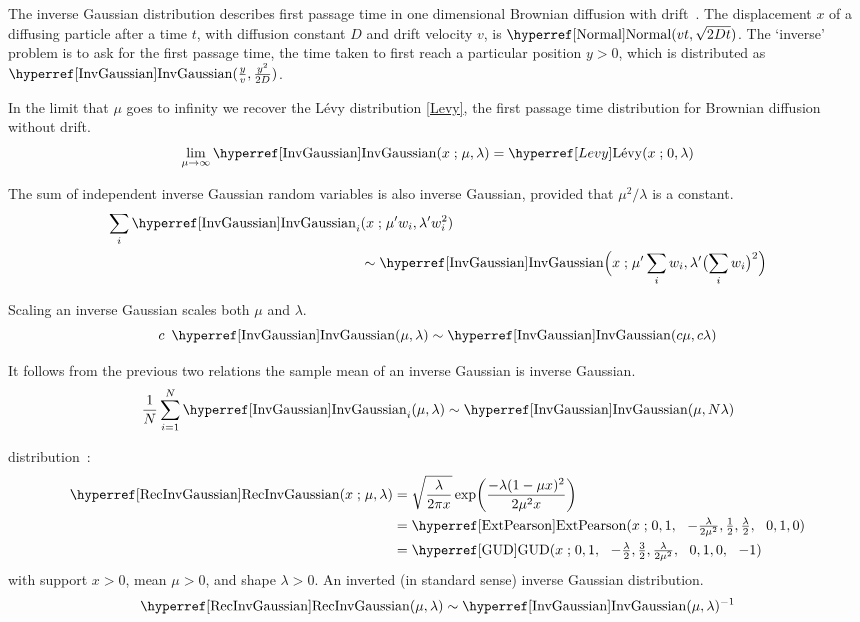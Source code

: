 The inverse Gaussian distribution describes first passage time in one dimensional Brownian diffusion with drift~\cite{Chhikara1989}. The displacement $x$ of a diffusing particle after a time $t$, with diffusion constant $D$ and drift velocity $v$,  is $\opr{Normal}(vt, \sqrt{2 D t})$. The `inverse' problem is to ask for the first passage time, the time taken to first reach a particular position $y>0$, which is distributed as $\opr{InvGaussian}(\tfrac{y}{v},\tfrac{y^2}{2D})$. 

In the limit that $\mu$ goes to infinity we recover the L\'evy distribution \eqref{Levy}, the first passage time distribution for Brownian diffusion without drift.
\[
\lim_{\mu\rightarrow\infty} \opr{InvGaussian}(x\given \mu, \lambda) = \Levy(x\given 0,\lambda) \checked
\notag
\]

The sum of independent inverse Gaussian random variables is also inverse Gaussian, provided that $\mu^2/\lambda$ is a constant.
\begin{align*}
\sum_i \opr{InvGaussian}_i &(x\given \mu' w_i, \lambda' w_i^2) 
\\
& \sim \opr{InvGaussian}\Bigl(x\given \mu' \sum_i w_i, \lambda' \bigl(\sum_i w_i\bigr)^2 \Bigr) \checked
\end{align*}

Scaling an inverse Gaussian scales both $\mu$ and $\lambda$. 
\[
c\ \opr{InvGaussian} (\mu, \lambda) \sim \opr{InvGaussian} (c \mu, c \lambda) \checked
\notag
\]

It follows from the previous two relations the sample mean of an inverse Gaussian is inverse Gaussian.
\[
\frac{1}{N} \sum_{i=1}^N \opr{InvGaussian}_i (\mu, \lambda) \sim \opr{InvGaussian} (\mu, N \lambda) \checked
\notag 
\]



 distribution~\cite{Johnson1994}: 
\begin{align}
\label{RecInvGaussian}
\opr{RecInvGaussian}(x\given \mu,\lambda) &= \sqrt{\frac{\lambda}{2\pi x}} \exp\Left(\frac{-\lambda (1-\mu x)^2}{2\mu^2 x}\Right) \checked
\\ \notag
& = \opr{ExtPearson}(x\given 0,1 \sep -\tfrac{\lambda}{2\mu^2}, \tfrac{1}{2}, \tfrac{\lambda}{2} \sep 0, 1,0) \checked
\\ \notag
& = \opr{GUD}(x\given 0,1 \sep -\tfrac{\lambda}{2}, \tfrac{3}{2}, \tfrac{\lambda}{2\mu^2} \sep 0, 1,0 \sep -1) \checked
\end{align}
with support $x>0$, mean $\mu>0$, and shape $\lambda>0$. An inverted (in standard sense) inverse Gaussian distribution. 
\[
\opr{RecInvGaussian}(\mu,\lambda) \sim \opr{InvGaussian}(\mu,\lambda)^{-1}
\notag
\]



